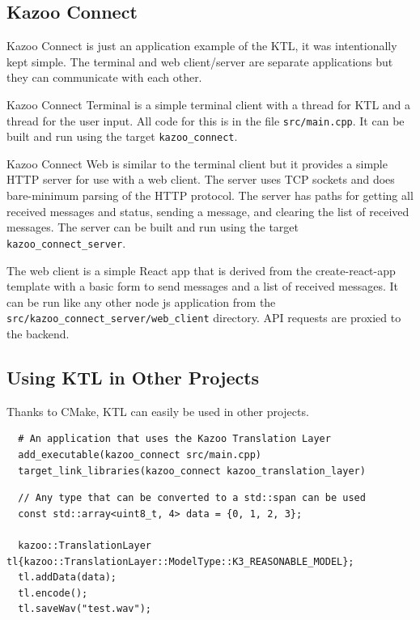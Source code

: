 \documentclass[]{article}
\begin{document}
\subsection{Kazoo Connect}

Kazoo Connect is just an application example of the KTL, it was intentionally kept simple. The terminal and web client/server are separate applications but they can communicate with each other.


Kazoo Connect Terminal is a simple terminal client with a thread for KTL and a thread for the user input. All code for this is in the file \texttt{src/main.cpp}. It can be built and run using the target \texttt{kazoo\_connect}.


Kazoo Connect Web is similar to the terminal client but it provides a simple HTTP server for use with a web client. The server uses TCP sockets and does bare-minimum parsing of the HTTP protocol. The server has paths for getting all received messages and status, sending a message, and clearing the list of received messages. The server can be built and run using the target \texttt{kazoo\_connect\_server}.

The web client is a simple React app that is derived from the create-react-app template with a basic form to send messages and a list of received messages. It can be run like any other node js application from the \texttt{src/kazoo\_connect\_server/web\_client} directory. API requests are proxied to the backend.


\subsection{Using KTL in Other Projects}

Thanks to CMake, KTL can easily be used in other projects.

\begin{verbatim}
  # An application that uses the Kazoo Translation Layer
  add_executable(kazoo_connect src/main.cpp)
  target_link_libraries(kazoo_connect kazoo_translation_layer)
\end{verbatim}


\begin{verbatim}
  // Any type that can be converted to a std::span can be used
  const std::array<uint8_t, 4> data = {0, 1, 2, 3};

  kazoo::TranslationLayer tl{kazoo::TranslationLayer::ModelType::K3_REASONABLE_MODEL};
  tl.addData(data);
  tl.encode();
  tl.saveWav("test.wav");
\end{verbatim}
\end{document}
